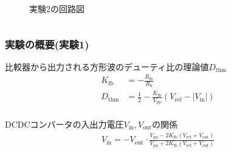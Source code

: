 \documentclass[mathsans]{beamer} %
\begin{document}
\begin{frame}
\begin{columns}
\begin{column}{.45\linewidth}
      \begin{figure}[htbp]
        \begin{center}
          \caption{実験2の回路図}\label{fig:DCDC_add_comp}
        \end{center}
      \end{figure}
    \end{column}
  \end{columns}
\end{frame}
\begin{frame}
  \frametitle{実験の概要(実験1)}
  比較器から出力される方形波のデューティ比の理論値$D_\mathrm{thm}$
  \begin{align}
    K_\mathrm{fb}  &= -\frac{R_\mathrm{fb}}{R_0}  \\
    D_\mathrm{thm} &= \frac{1}{2} - \frac{K_\mathrm{fb}}{V_\mathrm{pp}}(V_\mathrm{ref}-|V_\mathrm{in}|)
  \end{align}
  \hrulefill\\
  DCDCコンバータの入出力電圧$V_\mathrm{in},V_\mathrm{out}$の関係
  \begin{align}
    V_\mathrm{in} = - V_\mathrm{out} \cdot\frac{V_\mathrm{pp}-2K_\mathrm{fb}(V_\mathrm{ref}+V_\mathrm{out})}{V_\mathrm{pp}+2K_\mathrm{fb}(V_\mathrm{ref}+V_\mathrm{out})}
  \end{align}
\end{frame}
\end{document}

